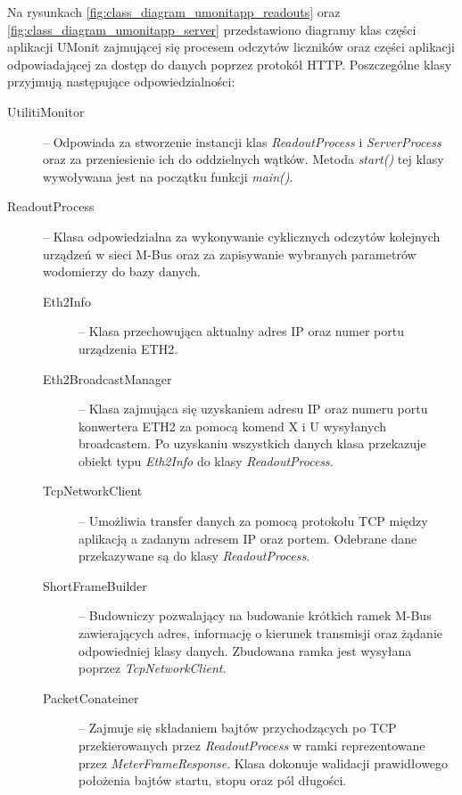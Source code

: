 Na rysunkach \ref{fig:class_diagram_umonitapp_readouts} oraz \ref{fig:class_diagram_umonitapp_server} przedstawiono diagramy klas części aplikacji UMonit zajmującej się procesem odczytów liczników oraz części aplikacji odpowiadającej za dostęp do danych poprzez protokół HTTP.
Poszczególne klasy przyjmują następujące odpowiedzialności:

\begin{description}

	\item[UtilitiMonitor] -- Odpowiada za stworzenie instancji klas \textit{ReadoutProcess} i \textit{ServerProcess} oraz za przeniesienie ich do oddzielnych wątków.
	Metoda \textit{start()} tej klasy wywoływana jest na początku funkcji \textit{main()}.

	\item[ReadoutProcess] -- Klasa odpowiedzialna za wykonywanie cyklicznych odczytów kolejnych urządzeń w sieci M-Bus oraz za zapisywanie wybranych parametrów wodomierzy do bazy danych.

		\begin{description}
			\item[Eth2Info] -- Klasa przechowująca aktualny adres IP oraz numer portu urządzenia ETH2.

			\item[Eth2BroadcastManager] -- Klasa zajmująca się uzyskaniem adresu IP oraz numeru portu konwertera ETH2 za pomocą komend X \cite{tibbo_x} i U \cite{tibbo_u} wysyłanych broadcastem.
			Po uzyskaniu wszystkich danych klasa przekazuje obiekt typu \textit{Eth2Info} do klasy \textit{ReadoutProcess}.
			
			\item[TcpNetworkClient] -- Umożliwia transfer danych za pomocą protokołu TCP między aplikacją a zadanym adresem IP oraz portem.
			Odebrane dane przekazywane są do klasy \textit{ReadoutProcess}.

			\item[ShortFrameBuilder] -- Budowniczy pozwalający na budowanie krótkich ramek M-Bus zawierających adres, informację o kierunek transmisji oraz żądanie odpowiedniej klasy danych.
			Zbudowana ramka jest wysyłana poprzez \textit{TcpNetworkClient}.

			\item[PacketConateiner] -- Zajmuje się składaniem bajtów przychodzących po TCP przekierowanych przez \textit{ReadoutProcess} w ramki reprezentowane przez \textit{MeterFrameResponse}.
			Klasa dokonuje walidacji prawidłowego położenia bajtów startu, stopu oraz pól długości.


\end{description}
\end{description}

